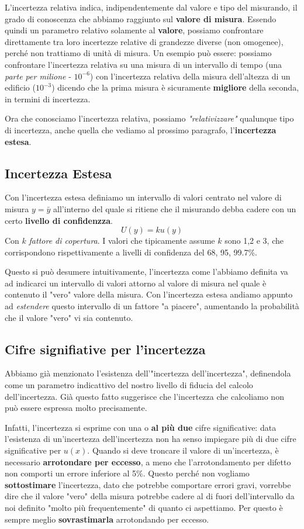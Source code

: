 \documentclass[a4paper,11pt]{report}
\begin{document}
L'incertezza relativa indica, indipendentemente dal valore e tipo del misurando, il grado di conoscenza che abbiamo raggiunto sul \textbf{valore di misura}. Essendo quindi un parametro relativo solamente al \textbf{valore}, possiamo confrontare direttamente tra loro incertezze relative di grandezze diverse (non omogenee), perché non trattiamo di unità di misura. Un esempio può essere: possiamo confrontare l'incertezza relativa su una misura di un intervallo di tempo (una \textit{parte per milione} - $10^{-6}$) con l'incertezza relativa della misura dell'altezza di un edificio ($10^{-3}$) dicendo che la prima misura è sicuramente \textbf{migliore} della seconda, in termini di incertezza.

Ora che conosciamo l'incertezza relativa, possiamo \textit{"relativizzare"} qualunque tipo di incertezza, anche quella che vediamo al prossimo paragrafo, l'\textbf{incertezza estesa}.
\subsection{Incertezza Estesa}
Con l'incertezza estesa definiamo un intervallo di valori centrato nel valore di misura $y = \bar{y}$ all'interno del quale si ritiene che il misurando debba cadere con un certo \textbf{livello di confidenzza}.
$$
  U(y) = k u(y)
$$
Con $k$ \textit{fattore di copertura}. I valori che tipicamente assume $k$ sono 1,2 e 3, che corrispondono rispettivamente a livelli di confidenza del 68, 95, 99.7\%.

Questo si può desumere intuitivamente, l'incertezza come l'abbiamo definita va ad indicarci un intervallo di valori attorno al valore di misura nel quale è contenuto il "vero" valore della misura. Con l'incertezza estesa andiamo appunto ad \textit{estendere} questo intervallo di un fattore "a piacere", aumentando la probabilità che il valore "vero" vi sia contenuto.
\subsection{Cifre signifiative per l'incertezza}
Abbiamo già menzionato l'esistenza dell'"incertezza dell'incertezza", definendola come un parametro indicattivo del nostro livello di fiducia del calcolo dell'incertezza. Già questo fatto suggerisce che l'incertezza che calcoliamo non può essere espressa molto precisamente.

Infatti, l'incertezza si esprime con una o \textbf{al più due} cifre significative: data l'esistenza di un'incertezza dell'incertezza non ha senso impiegare più di due cifre significative per $u(x)$. Quando si deve troncare il valore di un'incertezza, è necessario \textbf{arrotondare per eccesso}, a meno che l'arrotondamento per difetto non comporti un errore inferiore al 5\%. Questo perché non vogliamo \textbf{sottostimare} l'incertezza, dato che potrebbe comportare errori gravi, vorrebbe dire che il valore "vero" della misura potrebbe cadere al di fuori dell'intervallo da noi definito "molto più frequentemente" di quanto ci aspettiamo. Per questo è sempre meglio \textbf{sovrastimarla} arrotondando per eccesso.
\end{document}
